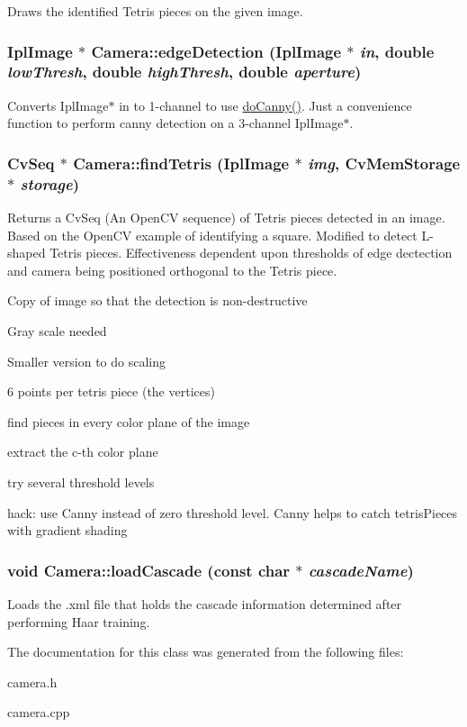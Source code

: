 \label{classCamera_a7b2811cc03fcdafa686a76863f2847c1}
Draws the identified Tetris pieces on the given image. \hypertarget{classCamera_a9d6533c84114b0724d28b940ed774362}{
\subsubsection[{edgeDetection}]{\setlength{\rightskip}{0pt plus 5cm}IplImage $\ast$ Camera::edgeDetection (IplImage $\ast$ {\em in}, \/  double {\em lowThresh}, \/  double {\em highThresh}, \/  double {\em aperture})}}
\label{classCamera_a9d6533c84114b0724d28b940ed774362}
Converts IplImage$\ast$ in to 1-\/channel to use \hyperlink{classCamera_ac5c9f313998f788fa4924a1a341fd96a}{doCanny()}. Just a convenience function to perform canny detection on a 3-\/channel IplImage$\ast$. \hypertarget{classCamera_a21b8d96617b3fede0373a7af8f998bb6}{
\subsubsection[{findTetris}]{\setlength{\rightskip}{0pt plus 5cm}CvSeq $\ast$ Camera::findTetris (IplImage $\ast$ {\em img}, \/  CvMemStorage $\ast$ {\em storage})}}
\label{classCamera_a21b8d96617b3fede0373a7af8f998bb6}
Returns a CvSeq (An OpenCV sequence) of Tetris pieces detected in an image. Based on the OpenCV example of identifying a square. Modified to detect L-\/shaped Tetris pieces. Effectiveness dependent upon thresholds of edge dectection and camera being positioned orthogonal to the Tetris piece. 

Copy of image so that the detection is non-\/destructive

Gray scale needed

Smaller version to do scaling

6 points per tetris piece (the vertices)

find pieces in every color plane of the image

extract the c-\/th color plane

try several threshold levels

hack: use Canny instead of zero threshold level. Canny helps to catch tetrisPieces with gradient shading \hypertarget{classCamera_ae03f9b6de6de4ff54394006116901cf1}{
\subsubsection[{loadCascade}]{\setlength{\rightskip}{0pt plus 5cm}void Camera::loadCascade (const char $\ast$ {\em cascadeName})}}
\label{classCamera_ae03f9b6de6de4ff54394006116901cf1}
Loads the .xml file that holds the cascade information determined after performing Haar training. 

The documentation for this class was generated from the following files:\begin{DoxyCompactItemize}
\item 
camera.h\item 
camera.cpp\end{DoxyCompactItemize}
